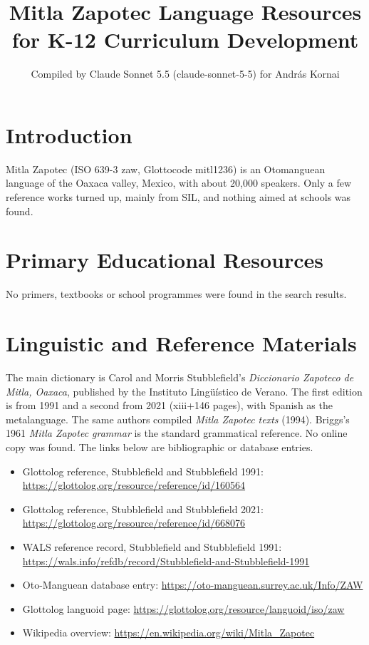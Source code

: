 \documentclass[12pt]{article}
\title{Mitla Zapotec Language Resources for K-12 Curriculum Development}
\author{Compiled by Claude Sonnet 5.5 (claude-sonnet-5-5) for Andr\'as Kornai}
\date{}
\begin{document}
\maketitle

\section{Introduction}
Mitla Zapotec (ISO 639-3 zaw, Glottocode mitl1236) is an Otomanguean language of the Oaxaca valley, Mexico, with about 20,000 speakers. Only a few reference works turned up, mainly from SIL, and nothing aimed at schools was found.

\section{Primary Educational Resources}
No primers, textbooks or school programmes were found in the search results.

\section{Linguistic and Reference Materials}
The main dictionary is Carol and Morris Stubblefield's \emph{Diccionario Zapoteco de Mitla, Oaxaca}, published by the Instituto Ling\"u\'istico de Verano. The first edition is from 1991 and a second from 2021 (xiii+146 pages), with Spanish as the metalanguage. The same authors compiled \emph{Mitla Zapotec texts} (1994). Briggs's 1961 \emph{Mitla Zapotec grammar} is the standard grammatical reference. No online copy was found. The links below are bibliographic or database entries.
\begin{itemize}
\item Glottolog reference, Stubblefield and Stubblefield 1991: \url{https://glottolog.org/resource/reference/id/160564}
\item Glottolog reference, Stubblefield and Stubblefield 2021: \url{https://glottolog.org/resource/reference/id/668076}
\item WALS reference record, Stubblefield and Stubblefield 1991: \url{https://wals.info/refdb/record/Stubblefield-and-Stubblefield-1991}
\item Oto-Manguean database entry: \url{https://oto-manguean.surrey.ac.uk/Info/ZAW}
\item Glottolog languoid page: \url{https://glottolog.org/resource/languoid/iso/zaw}
\item Wikipedia overview: \url{https://en.wikipedia.org/wiki/Mitla_Zapotec}
\end{itemize}
\end{document}
